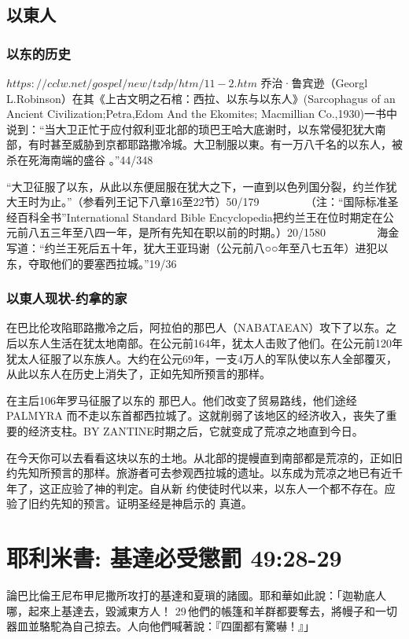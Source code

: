 \subsection{以東人}
\subsubsection{以东的历史}
$https://cclw.net/gospel/new/tzdp/htm/11-2.htm$
乔治·鲁宾逊（Georgl L.Robinson）在其《上古文明之石棺：西拉、以东与以东人》(Sarcophagus of an Ancient Civilization;Petra,Edom And the Ekomites; Macmillian Co.,1930)一书中说到：“当大卫正忙于应付叙利亚北部的琐巴王哈大底谢时，以东常侵犯犹大南部，有时甚至威胁到京都耶路撒冷城。大卫制服以東。有一万八千名的以东人，被杀在死海南端的盛谷 。”44/348

“大卫征服了以东，从此以东便屈服在犹大之下，一直到以色列国分裂，约兰作犹大王时为止。”（参看列王记下八章16至22节）50/179
　　
　　（注：“国际标准圣经百科全书”International Standard Bible Encyclopedia把约兰王在位时期定在公元前八五三年至八四一年，是所有先知在职以前的时期。）20/1580
　　
　　海金写道：“约兰王死后五十年，犹大王亚玛谢（公元前八○○年至八七五年）进犯以东，夺取他们的要塞西拉城。”19/36
　　


\subsubsection{以東人现状-约拿的家}
在巴比伦攻陷耶路撒冷之后，阿拉伯的那巴人（NABATAEAN）攻下了以东。之后以东人生活在犹太地南部。在公元前164年，犹太人击败了他们。在公元前120年犹太人征服了以东族人。大约在公元69年，一支4万人的军队使以东人全部覆灭，从此以东人在历史上消失了，正如先知所预言的那样。

在主后106年罗马征服了以东的 那巴人。他们改变了贸易路线，他们途经PALMYRA 而不走以东首都西拉城了。这就削弱了该地区的经济收入，丧失了重要的经济支柱。BY ZANTINE时期之后，它就变成了荒凉之地直到今日。

在今天你可以去看看这块以东的土地。从北部的提幔直到南部都是荒凉的，正如旧约先知所预言的那样。旅游者可去参观西拉城的遗址。以东成为荒凉之地已有近千年了，这正应验了神的判定。自从新 约使徒时代以来，以东人一个都不存在。应验了旧约先知的预言。证明圣经是神启示的 真道。




\section{耶利米書: 基達必受懲罰 49:28-29}
論巴比倫王尼布甲尼撒所攻打的基達和夏瑣的諸國。耶和華如此說：「迦勒底人哪，起來上基達去，毀滅東方人！ 29 他們的帳篷和羊群都要奪去，將幔子和一切器皿並駱駝為自己掠去。人向他們喊著說：『四圍都有驚嚇！』」



